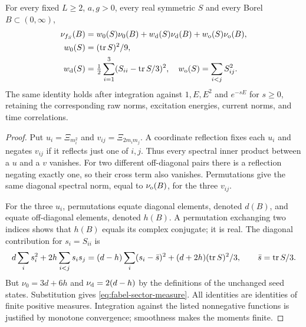 \begin{theorem}\label{thm:fabel-quadratic-measure}
For every fixed $L\ge2$, $a,g>0$, every real symmetric $S$ and every Borel
$B\subset(0,\infty)$,
\begin{align}
 \nu_{f_S}(B)&=w_0(S)\nu_0(B)+w_{\rm d}(S)\nu_{\rm d}(B)
                         +w_{\rm o}(S)\nu_{\rm o}(B),\label{eq:fabel-sector-measure}\\
 w_0(S)&=(\operatorname{tr} S)^2/9,\nonumber\\
 w_{\rm d}(S)&=\tfrac12\sum_{i=1}^3(S_{ii}-\operatorname{tr} S/3)^2,\quad
 w_{\rm o}(S)=\sum_{i<j}S_{ij}^2.\nonumber
\end{align}
The same identity holds after integration against $1,E,E^2$ and
$e^{-sE}$ for $s\ge0$, retaining the corresponding raw norms,
excitation energies, current norms, and time correlations.
\end{theorem}
\begin{proof}
Put $u_i=\Xi_{m_i^2}$ and $v_{ij}=\Xi_{2m_im_j}$.
A coordinate reflection fixes each $u_i$ and negates $v_{ij}$ if it
reflects just one of $i,j$. Thus every spectral inner product between
a $u$ and a $v$ vanishes. For two different off-diagonal pairs there
is a reflection negating exactly one, so their cross term also vanishes.
Permutations give the same diagonal spectral norm, equal to $\nu_{\rm o}(B)$,
for the three $v_{ij}$.

For the three $u_i$, permutations equate diagonal elements, denoted
$d(B)$, and equate off-diagonal elements, denoted $h(B)$.
A permutation exchanging two indices shows that $h(B)$ equals its
complex conjugate; it is real. The diagonal contribution for $s_i=S_{ii}$
is
\[
 d\sum_i s_i^2+2h\sum_{i<j}s_is_j
 =(d-h)\sum_i(s_i-\bar s)^2+(d+2h)(\operatorname{tr} S)^2/3,
 \qquad\bar s=\operatorname{tr} S/3.
\]
But $\nu_0=3d+6h$ and $\nu_{\rm d}=2(d-h)$ by the definitions of the
unchanged seed states. Substitution gives \eqref{eq:fabel-sector-measure}.
All identities are identities of finite positive measures. Integration
against the listed nonnegative functions is justified by monotone
convergence; smoothness makes the moments finite.
\end{proof}

